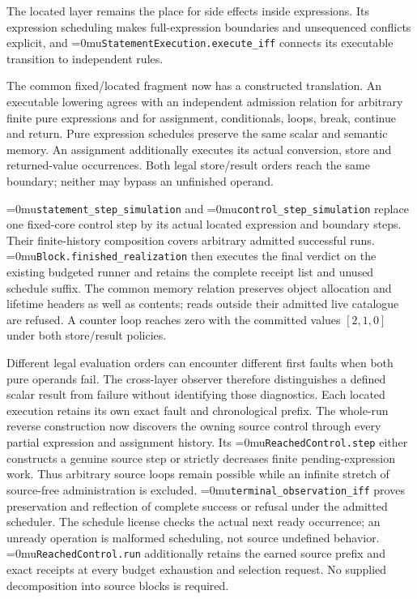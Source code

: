 \documentclass[11pt,a4paper]{article}
\newcommand{\name}[1]{\textup{\Urlmuskip=0mu\relax\nolinkurl{#1}}}
\begin{document}
The located layer remains the place for side effects inside expressions. Its
expression scheduling makes full-expression boundaries and unsequenced conflicts
explicit, and \name{StatementExecution.execute_iff} connects its executable
transition to independent rules.

The common fixed/located fragment now has a constructed translation. An
executable lowering agrees with an independent admission relation for arbitrary
finite pure expressions and for assignment, conditionals, loops, break,
continue and return. Pure expression schedules preserve the same scalar and
semantic memory. An assignment additionally executes its actual conversion,
store and returned-value occurrences. Both legal store/result orders reach
the same boundary; neither may bypass an unfinished operand.

\name{statement_step_simulation} and \name{control_step_simulation} replace
one fixed-core control step by its actual located expression and boundary
steps. Their finite-history composition covers arbitrary admitted successful
runs. \name{Block.finished_realization} then executes the final verdict on the
existing budgeted runner and retains the complete receipt list and unused
schedule suffix. The common memory relation preserves object allocation and
lifetime headers as well as contents; reads outside their admitted live
catalogue are refused. A counter loop reaches zero with the committed values
$[2,1,0]$ under both store/result policies.

Different legal evaluation orders can encounter different first faults when
both pure operands fail. The cross-layer observer therefore distinguishes a
defined scalar result from failure without identifying those diagnostics.
Each located execution retains its own exact fault and chronological prefix.
The whole-run reverse construction now discovers the owning source control
through every partial expression and assignment history. Its
\name{ReachedControl.step} either constructs a genuine source step or strictly
decreases finite pending-expression work. Thus arbitrary source loops remain
possible while an infinite stretch of source-free administration is excluded.
\name{terminal_observation_iff} proves preservation and reflection of complete
success or refusal under the admitted scheduler. The schedule license checks
the actual next ready occurrence; an unready operation is malformed scheduling,
not source undefined behavior. \name{ReachedControl.run} additionally retains
the earned source prefix and exact receipts at every budget exhaustion and
selection request. No supplied decomposition into source blocks is required.
\end{document}
